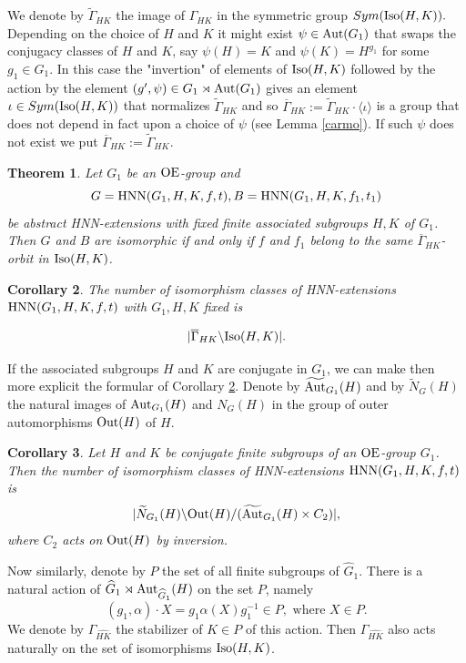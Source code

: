 \documentclass[a4paper,12pt]{article}
\newtheorem{thm}{Theorem}[section]
\newtheorem{cor}[thm]{Corollary}
\def\OE{{\rm OE}}
\def\aut {{\rm Aut}}
\def\out {{\rm Out}}
\def\hnn {{\rm HNN}}
\def\Iso {{\rm Iso}}
\begin{document}
 
 We denote by $\widetilde\Gamma_{HK}$ the image of $\Gamma_{HK}$ in the symmetric group $Sym(\Iso(H,K)).$ Depending on the choice  of $H$ and $K$  it might exist $\psi\in \aut(G_1)$  that swaps the conjugacy classes of $H$ and $K$, say $\psi(H)=K$ and $\psi(K)=H^{g_1}$ for some $g_1\in G_1$. In this case the "invertion" of elements of $\Iso(H,K)$ followed by the action by the element $( g', \psi)\in G_1\rtimes \aut(G_1)$ gives an element $\iota\in Sym(\Iso(H,K))$ that normalizes $\widetilde\Gamma_{HK}$ and so $\overline\Gamma_{HK}:=\widetilde\Gamma_{HK} \cdot \langle\iota\rangle$ is a group that does not depend in fact upon a choice of $\psi$ (see Lemma \ref{carmo}). If such $\psi$ does not exist we put $\overline\Gamma_{HK}:=\widetilde\Gamma_{HK}$. 


\begin{thm} Let $G_1$ be an $\OE$-group and $$G=\hnn(G_1, H, K, f, t), B=\hnn(G_1, H, K, f_1, t_1)$$ be  abstract HNN-extensions with fixed finite associated  subgroups $H,K$ of $G_1$. Then $G$ and $B$ are isomorphic if and only if $f$ and $f_1$ belong to the same $\overline\Gamma_{HK}$-orbit in $\Iso(H,K)$.    
\end{thm}

\begin{cor}\label{general iso} The number of isomorphism classes of HNN-extensions \break
$\hnn(G_1,H,K,f,t)$  with $G_1,H,K$ fixed is 

$$|\overline{\Gamma}_{HK}\backslash \Iso(H,K)|.$$

\end{cor}

\bigskip
If the associated subgroups $H$ and $K$ are conjugate in $G_1$, we can make then more explicit the formular of Corollary \ref{general iso}. 
Denote by $\widetilde{\aut}_{G_1}(H)$ and by $\widetilde{N}_{G}(H)$ the natural images of $\aut_{G_1}(H)$ and $N_G(H)$ in the group of outer automorphisms $\out(H)$ of $H$.


\begin{cor} Let $H$ and $K$ be conjugate finite subgroups of an $\OE$-group $G_1$. Then the number  of isomorphism classes of HNN-extensions \break $\hnn(G_1, H, K, f,t)$ 
 is $$|\widetilde{N}_{G_1}(H) \backslash \out(H)/  ( \widetilde{\aut}_{G_1}(H) \times C_2) |,$$
 where $C_2$ acts on $\out(H)$ by inversion. 
\end{cor}



Now similarly, denote by $P$ the set of all finite subgroups of $\widehat G_1.$ There is a natural action of $\widehat G_1\rtimes \aut_{\widehat G_1}(H)$ on the set $P$, namely \begin{equation} (g_1,\alpha)\cdot X= g_1\alpha(X)g_1^{-1} \in P, \mbox{ where } X \in P. \end{equation}
 We denote by $\Gamma_{\widehat{HK}}$  the stabilizer of $K\in P$ of this action. 
  Then $\Gamma_{\widehat{HK}}$ also acts naturally on the set of isomorphisms $\Iso(H,K)$. 
  
\end{document}
